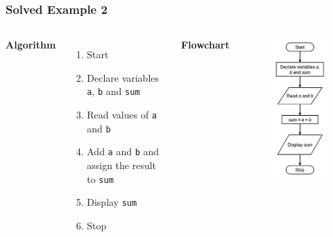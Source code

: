 \documentclass{beamer}
\begin{document}
\begin{frame}[fragile]
    \frametitle{Solved Example 2}
    \begin{columns}
    \textbf{Algorithm}
    \begin{enumerate}
        \item Start
        \item Declare variables \texttt{a}, \texttt{b} and \texttt{sum}
        \item Read values of \texttt{a} and \texttt{b}
        \item Add \texttt{a} and \texttt{b} and assign the result to \texttt{sum}
        \item Display \texttt{sum}
        \item Stop
    \end{enumerate}
    \textbf{Flowchart}
    \begin{figure}
        \centering
        \includegraphics[scale=0.55]{p2flow}
    \end{figure}
    \end{columns}
\end{frame}
\end{document}
